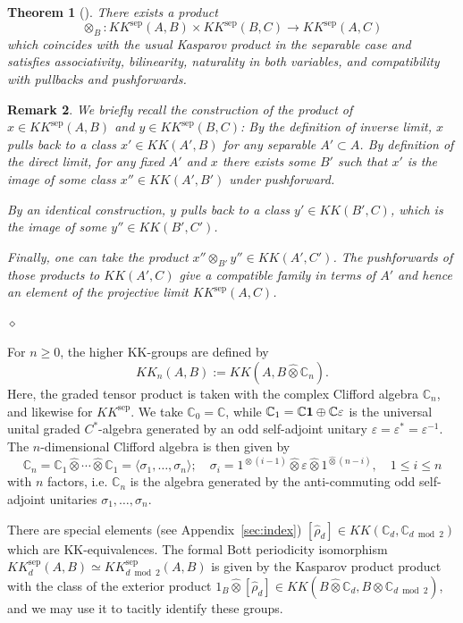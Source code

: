\documentclass[12pt]{amsart}
\newtheorem{theorem}{Theorem}[section]
\newtheorem{remark}[theorem]{Remark}
\newcommand{\CM}{{\mathbb C}}
\newcommand{\one}{{\bf 1}}
\newcommand{\ep}{\varepsilon}
\begin{document}
\begin{theorem}[{\cite{Skandalis1988}}]
There exists a product
\[\otimes_B: KK^{\mathrm{sep}}(A,B) \times KK^{\mathrm{sep}}(B,C) \to KK^{\mathrm{sep}}(A,C)\]
which coincides with the usual Kasparov product in the separable case and satisfies associativity, bilinearity,
naturality in both variables, and compatibility with pullbacks and pushforwards.
\end{theorem}

\begin{remark}{\rm
We briefly recall the construction of the product of $x\in KK^{\mathrm{sep}}(A,B)$ and $y\in KK^{\mathrm{sep}}(B,C)$: By the definition of inverse limit, $x$ pulls back to a class $x'\in KK(A',B)$ for any separable $A'\subset A$. 
By definition of the direct limit, for any fixed $A'$ and $x$ there exists some $B'$ such that $x'$ is the image of some class $x''\in KK(A',B')$ under pushforward. 

By an identical construction, $y$ pulls back to a class $y' \in KK(B', C)$, which is the image of some $y''\in KK(B', C')$. 

Finally, one can take the product $x''\otimes_{B'} y'' \in KK(A',C')$. The pushforwards of those products to $KK(A', C)$ give a compatible family in terms of $A'$ and hence an element of the projective limit $KK^{\mathrm{sep}}(A,C)$.

}$\diamond$
\end{remark}

For $n\geq 0$, the higher KK-groups are defined by 
\begin{equation}\label{eqn:higher_kk_def}
KK_n(A,B):=KK(A,B\hat{\otimes}\CM_n). \end{equation}
Here, the graded tensor product is taken with the complex Clifford algebra $\CM_n$, and likewise for $KK^{\mathrm{sep}}$. We take $\CM_0=\CM$, while
$\CM_1=\CM\one\oplus\CM\ep$ is the universal unital graded
$C^*$-algebra generated by an odd self-adjoint unitary
$\ep=\ep^*=\ep^{-1}$. 
The $n$-dimensional Clifford algebra is then given by
\[\CM_n= \CM_1\hat{\otimes}\cdots\hat{\otimes}\CM_1 = \langle \sigma_1,\dots, \sigma_n \rangle; \quad \sigma_i = 1^{\hat{\otimes}(i-1)} \hat{\otimes} \ep \hat{\otimes}  1^{\hat{\otimes}(n-i)}, \quad 1 \leq i \leq n \]
with $n$ factors, i.e. $\CM_n$ is the algebra generated by the anti-commuting odd self-adjoint
unitaries $\sigma_1,\ldots,\sigma_n$.

There are special elements (see Appendix~\ref{sec:index}) $[\hat{\rho}_d]\in KK(\CM_d, \CM_{d\bmod 2})$ which are KK-equivalences. The formal Bott periodicity isomorphism $KK_d^{\mathrm{sep}}(A,B) \simeq  KK_{d\bmod 2}^{\mathrm{sep}}(A,B)$ is given by the Kasparov product product with the class of the exterior product $1_B \hat{\otimes} [\hat{\rho}_d] \in KK(B \hat{\otimes}\CM_d, B \hat{\otimes} \CM_{d \bmod 2})$, and we may use it to tacitly identify these groups.
\end{document}
